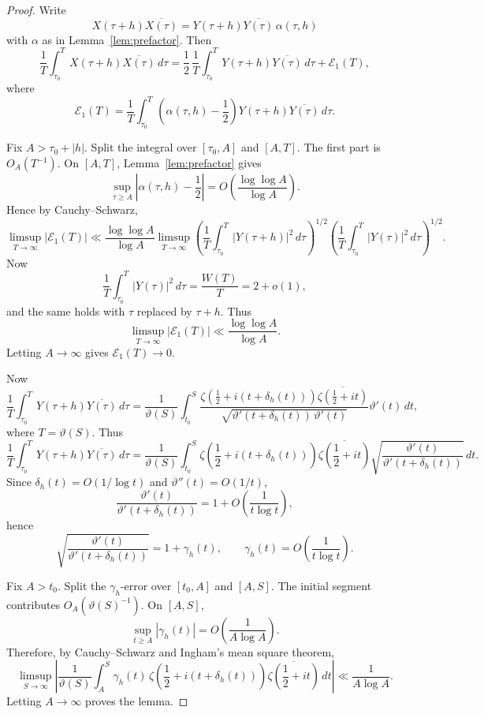 \documentclass[11pt]{article}
\theoremstyle{plain}
\theoremstyle{definition}
\begin{document}
\begin{proof}
Write
\[
X(\tau+h)\overline{X(\tau)}
=
Y(\tau+h)\overline{Y(\tau)}\,\alpha(\tau,h)
\]
with $\alpha$ as in Lemma~\ref{lem:prefactor}. Then
\[
\frac1T\int_{\tau_0}^T X(\tau+h)\overline{X(\tau)}\,d\tau
=
\frac12\,\frac1T\int_{\tau_0}^T Y(\tau+h)\overline{Y(\tau)}\,d\tau
+\mathcal E_1(T),
\]
where
\[
\mathcal E_1(T)
=
\frac1T\int_{\tau_0}^T
\left(\alpha(\tau,h)-\frac12\right)
Y(\tau+h)\overline{Y(\tau)}\,d\tau.
\]

Fix $A>\tau_0+|h|$. Split the integral over $[\tau_0,A]$ and $[A,T]$. The first part is
$O_A(T^{-1})$. On $[A,T]$, Lemma~\ref{lem:prefactor} gives
\[
\sup_{\tau\ge A}
\left|\alpha(\tau,h)-\frac12\right|
=
O\!\left(\frac{\log\log A}{\log A}\right).
\]
Hence by Cauchy--Schwarz,
\[
\limsup_{T\to\infty} |\mathcal E_1(T)|
\ll
\frac{\log\log A}{\log A}
\limsup_{T\to\infty}
\left(\frac1T\int_{\tau_0}^T |Y(\tau+h)|^2\,d\tau\right)^{1/2}
\left(\frac1T\int_{\tau_0}^T |Y(\tau)|^2\,d\tau\right)^{1/2}.
\]
Now
\[
\frac1T\int_{\tau_0}^T |Y(\tau)|^2\,d\tau=\frac{W(T)}{T}=2+o(1),
\]
and the same holds with $\tau$ replaced by $\tau+h$. Thus
\[
\limsup_{T\to\infty} |\mathcal E_1(T)|
\ll
\frac{\log\log A}{\log A}.
\]
Letting $A\to\infty$ gives $\mathcal E_1(T)\to 0$.

Now
\[
\frac1T\int_{\tau_0}^T Y(\tau+h)\overline{Y(\tau)}\,d\tau
=
\frac{1}{\vartheta(S)}
\int_{t_0}^{S}
\frac{
\zeta(\frac12+i(t+\delta_h(t)))\overline{\zeta(\frac12+it)}
}{
\sqrt{\vartheta'(t+\delta_h(t))\,\vartheta'(t)}
}
\vartheta'(t)\,dt,
\]
where $T=\vartheta(S)$.
Thus
\[
\frac1T\int_{\tau_0}^T Y(\tau+h)\overline{Y(\tau)}\,d\tau
=
\frac{1}{\vartheta(S)}
\int_{t_0}^{S}
\zeta\!\left(\frac12+i(t+\delta_h(t))\right)\overline{\zeta\!\left(\frac12+it\right)}
\sqrt{\frac{\vartheta'(t)}{\vartheta'(t+\delta_h(t))}}\,dt.
\]
Since $\delta_h(t)=O(1/\log t)$ and $\vartheta''(t)=O(1/t)$,
\[
\frac{\vartheta'(t)}{\vartheta'(t+\delta_h(t))}
=
1+O\!\left(\frac{1}{t\log t}\right),
\]
hence
\[
\sqrt{\frac{\vartheta'(t)}{\vartheta'(t+\delta_h(t))}}
=
1+\gamma_h(t),
\qquad
\gamma_h(t)=O\!\left(\frac{1}{t\log t}\right).
\]

Fix $A>t_0$. Split the $\gamma_h$-error over $[t_0,A]$ and $[A,S]$. The initial segment contributes
$O_A(\vartheta(S)^{-1})$. On $[A,S]$,
\[
\sup_{t\ge A} |\gamma_h(t)|=O\!\left(\frac{1}{A\log A}\right).
\]
Therefore, by Cauchy--Schwarz and Ingham's mean square theorem,
\[
\limsup_{S\to\infty}
\left|
\frac{1}{\vartheta(S)}
\int_A^{S}
\gamma_h(t)\,
\zeta\!\left(\frac12+i(t+\delta_h(t))\right)\overline{\zeta\!\left(\frac12+it\right)}
\,dt
\right|
\ll
\frac{1}{A\log A}.
\]
Letting $A\to\infty$ proves the lemma.
\end{proof}
\end{document}
